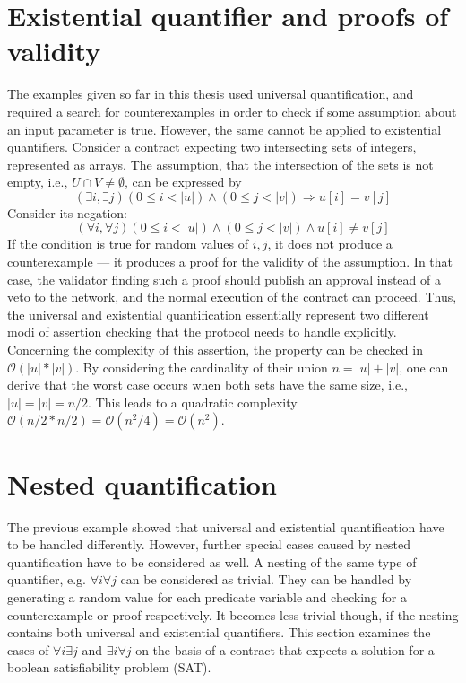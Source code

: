\section{Existential quantifier and proofs of validity}\label{sec:existential}
The examples given so far in this thesis used universal quantification, and required a search for counterexamples in order to check if some assumption about an input parameter is true. However, the same cannot be applied to existential quantifiers. Consider a contract expecting two intersecting sets of integers, represented as arrays. The assumption, that the intersection of the sets is not empty, i.e., $U \cap V \neq \emptyset$, can be expressed by
\begin{equation}\label{eq:intersect}
  (\exists i, \exists j) (0 \le i < |u|) \land (0 \le j < |v|) \Rightarrow u[i] = v[j]
\end{equation}
Consider its negation:
\begin{equation}\label{eq:intersect_neg}
  (\forall i, \forall j) (0 \le i < |u|) \land (0 \le j < |v|) \land u[i] \neq v[j]
\end{equation}
If the condition is true for random values of $i,j$, it does not produce a counterexample --- it produces a proof for the validity of the assumption. In that case, the validator finding such a proof should publish an approval instead of a veto to the network, and the normal execution of the contract can proceed. Thus, the universal and existential quantification essentially represent two different modi of assertion checking that the protocol needs to handle explicitly.\\
Concerning the complexity of this assertion, the property can be checked in $\mathcal{O}(|u|*|v|)$. By considering the cardinality of their union $n = |u|+|v|$, one can derive that the worst case occurs when both sets have the same size, i.e., $|u| = |v| = n/2$. This leads to a quadratic complexity $\mathcal{O}(n/2 * n/2) = \mathcal{O}(n^2/4) = \mathcal{O}(n^2)$.

\section{Nested quantification}
The previous example showed that universal and existential quantification have to be handled differently. However, further special cases caused by nested quantification have to be considered as well. A nesting of the same type of quantifier, e.g. $\forall i \forall j$ can be considered as trivial. They can be handled by generating a random value for each predicate variable and checking for a counterexample or proof respectively. It becomes less trivial though, if the nesting contains both universal and existential quantifiers. This section examines the cases of $\forall i \exists j$ and $\exists i \forall j$ on the basis of a contract that expects a solution for a boolean satisfiability problem (SAT).

